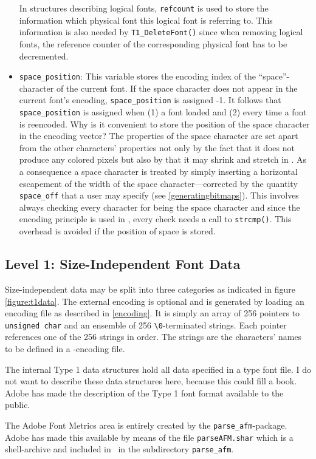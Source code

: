 \begin{itemize}
  In structures describing logical fonts, \verb+refcount+ is used to
  store the information which physical font this logical font is
  referring to. This information is also needed by
  \verb+T1_DeleteFont()+ since when removing logical fonts, the
  reference counter of the corresponding physical font has to be
  decremented.
\item \verb+space_position+: This variable stores the encoding index of the
  ``space''-character of the current font. If the space character does not
  appear in the current font's encoding, \verb+space_position+ is assigned
  -1. It follows that \verb+space_position+
  is assigned when (1) a font loaded and (2) every time a
  font is reencoded. Why is it convenient to store the position of the space
  character in the encoding vector? The properties of the space character are
  set apart from the other characters' properties not only by the fact that it
  does not produce any colored pixels but also by that it may shrink and
  stretch in \tonelib. As a consequence a space character is treated by simply
  inserting a horizontal escapement of the width of the space
  character---corrected by the quantity \verb+space_off+ that a user may
  specify (see \ref{generatingbitmaps}). This involves always checking every
  character for being the space character and since the encoding principle is
  used in \tonelib, every check needs a call to \verb+strcmp()+. This overhead
  is avoided if the position of space is stored.
\end{itemize} 
\subsection{Level 1: Size-Independent Font Data}
\label{sizeindependentfontdata}%
Size-independent data may be split into three categories as indicated in
figure \ref{figure:t1data}. The external encoding is optional and is generated
by loading an encoding file as described in \ref{encoding}. It is simply an
array of 256 pointers to \verb+unsigned char+ and an ensemble of 256
\verb+\0+-terminated strings. Each pointer references one of the 256 strings
in order. The strings are the characters' names to be defined in a
\tonelib-encoding file.

The internal Type 1 data structures hold all data specified in a type font
file. I do not want to describe these data structures here, because this could
fill a book. Adobe has made the description of the Type 1 font format
available to the public. 

The Adobe Font Metrics area is entirely created by the
\verb+parse_afm+-package. Adobe has made this available by means of the file
\verb+parseAFM.shar+ which is a shell-archive and included in \tonelib\ in the
subdirectory \verb+parse_afm+.

